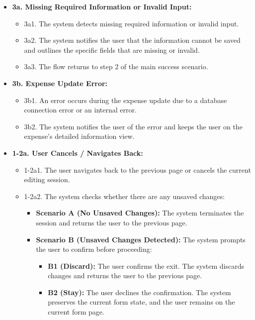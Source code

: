 \begin{itemize} [label={}, leftmargin=0.75cm, noitemsep]

    \item \textbf{3a. Missing Required Information or Invalid Input:}
    \begin{itemize} [label={}, leftmargin=0.75cm, noitemsep]
        \item 3a1. The system detects missing required information or invalid input.
        \item 3a2. The system notifies the user that the information cannot be saved and outlines the specific fields that are missing or invalid.
        \item 3a3. The flow returns to step 2 of the main success scenario.
    \end{itemize}

    \item \textbf{3b. Expense Update Error:}
    \begin{itemize} [label={}, leftmargin=0.75cm, noitemsep]
        \item 3b1. An error occurs during the expense update due to a database connection error or an internal error.
        \item 3b2. The system notifies the user of the error and keeps the user on the expense's detailed information view.
    \end{itemize}

    \item \textbf{1-2a. User Cancels / Navigates Back:}
    \begin{itemize} [label={}, leftmargin=0.75cm, noitemsep]
        \item 1-2a1. The user navigates back to the previous page or cancels the current editing session.
        \item 1-2a2. The system checks whether there are any unsaved changes:
        \begin{itemize} [label={}, leftmargin=0.75cm, noitemsep]
            \item \textbf{Scenario A (No Unsaved Changes):} The system terminates the session and returns the user to the previous page.
            \item \textbf{Scenario B (Unsaved Changes Detected):} The system prompts the user to confirm before proceeding:
            \begin{itemize} [label={}, leftmargin=0.75cm, noitemsep]
                \item \textbf{B1 (Discard):} The user confirms the exit. The system discards changes and returns the user to the previous page.
                \item \textbf{B2 (Stay):} The user declines the confirmation. The system preserves the current form state, and the user remains on the current form page.
            \end{itemize}
        \end{itemize}
    \end{itemize}

\end{itemize}

\vspace{0.3cm}
